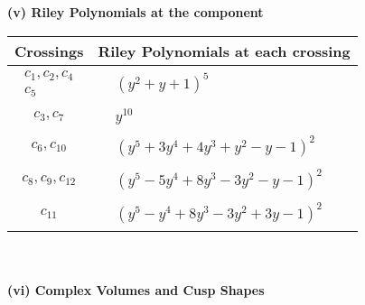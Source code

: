 \documentclass[1p]{elsarticle_modified}
\theoremstyle{definition}
\begin{document}
\newpage\renewcommand{\arraystretch}{1}
\flushleft \textbf{(v) Riley Polynomials at the component}\newline \\
\begin{tabular}{m{50pt}|m{274pt}}
Crossings & \hspace{64pt}Riley Polynomials at each crossing \\
\hline $$\begin{aligned}c_{1},c_{2},c_{4}\\c_{5}\end{aligned}$$&$\begin{aligned}
&(y^2+y+1)^5
\end{aligned}$\\
\hline $$\begin{aligned}c_{3},c_{7}\end{aligned}$$&$\begin{aligned}
&y^{10}
\end{aligned}$\\
\hline $$\begin{aligned}c_{6},c_{10}\end{aligned}$$&$\begin{aligned}
&(y^5+3 y^4+4 y^3+y^2- y-1)^2
\end{aligned}$\\
\hline $$\begin{aligned}c_{8},c_{9},c_{12}\end{aligned}$$&$\begin{aligned}
&(y^5-5 y^4+8 y^3-3 y^2- y-1)^2
\end{aligned}$\\
\hline $$\begin{aligned}c_{11}\end{aligned}$$&$\begin{aligned}
&(y^5- y^4+8 y^3-3 y^2+3 y-1)^2
\end{aligned}$\\
\hline
\end{tabular}\\~\\
\newpage\flushleft \textbf{(vi) Complex Volumes and Cusp Shapes}
\end{document}
